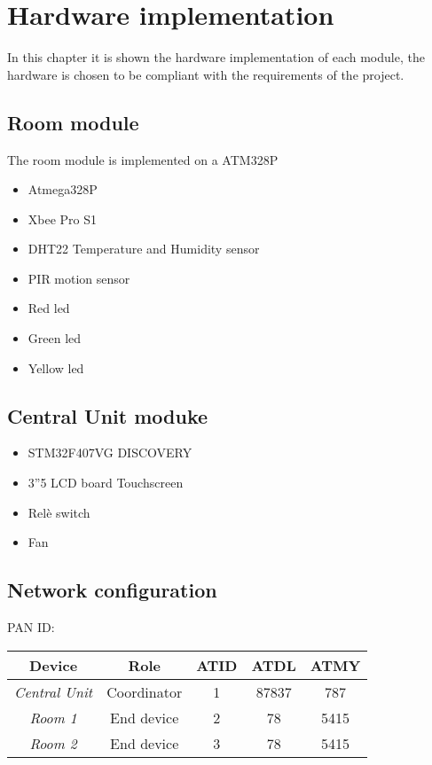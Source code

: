 \section{Hardware implementation}
In this chapter it is shown the hardware implementation of each module, the hardware is chosen
to be compliant with the requirements of the project.

\subsection{Room module}
The room module is implemented on a ATM328P
\begin{itemize}
	\item Atmega328P
	\item Xbee Pro S1
	\item DHT22 Temperature and Humidity sensor
	\item PIR motion sensor
	\item Red led
	\item Green led
	\item Yellow led
\end{itemize}

\subsection{Central Unit moduke}
\begin{itemize}
	\item STM32F407VG DISCOVERY
	\item 3”5 LCD board Touchscreen
	\item Relè switch
	\item Fan
\end{itemize}

\subsection{Network configuration}
PAN ID:
\begin{center}
	\begin{tabular}{|c || c | c | c | c|} 
	\hline
	\textbf{Device} & \textbf{Role} & \textbf{ATID} & \textbf{ATDL} & \textbf{ATMY} \\ [0.5ex] 
	\hline
	\textit{Central Unit} & Coordinator & 1 & 87837 & 787 \\ 
	\hline
	\textit{Room 1} & End device & 2 & 78 & 5415 \\
	\hline
	\textit{Room 2} & End device & 3 & 78 & 5415 \\
	\hline
   \end{tabular}
   \end{center}